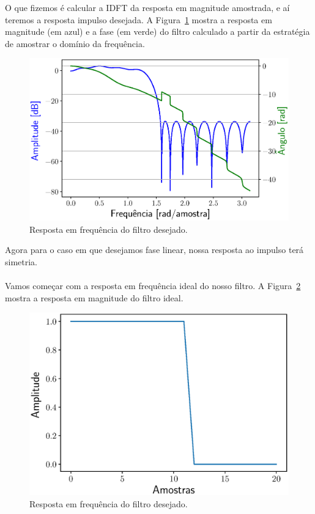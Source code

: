 \documentclass{homeworkclass}
\begin{document}
\begin{homeworkProblem}
\begin{homeworkSection}
O que fizemos é calcular a IDFT da resposta em magnitude amostrada, e aí teremos a resposta impulso desejada. A Figura~\ref{fig:freq_nl} mostra a resposta em magnitude (em azul) e a fase (em verde) do filtro calculado a partir da estratégia de amostrar o domínio da frequência.
\begin{figure}[!ht]
	\centering
	\includegraphics[width=0.6\linewidth]{figs/freq_nl}
	\caption{Resposta em frequência do filtro desejado.}
	\label{fig:freq_nl}
\end{figure}



\end{homeworkSection}


\begin{homeworkSection}

Agora para o caso em que desejamos fase linear, nossa resposta ao impulso terá simetria.

\paragraph{}Vamos começar com a resposta em frequência ideal do nosso filtro. A Figura~\ref{fig:ideal} mostra a resposta em magnitude do filtro ideal.

\begin{figure}[!ht]
	\centering
	\includegraphics[width=0.55\linewidth]{figs/ideal}
	\caption{Resposta em frequência do filtro desejado.}
	\label{fig:ideal}
\end{figure}


\end{homeworkSection}
\end{homeworkProblem}
\end{document}
